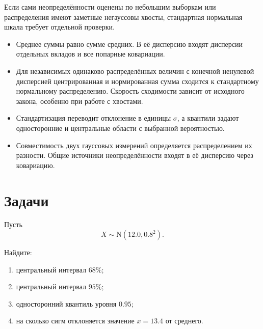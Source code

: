 \documentclass[
  russian,
  11pt,
  a4paper,
  open=any]{scrbook}
\providecommand{\tightlist}{%
  \setlength{\itemsep}{0pt}\setlength{\parskip}{0pt}}
\begin{document}
Если сами неопределённости оценены по небольшим выборкам или
распределения имеют заметные негауссовы хвосты, стандартная нормальная
шкала требует отдельной проверки.

\begin{bookchaptersummary}

\begin{itemize}
\tightlist
\item
  Среднее суммы равно сумме средних. В её дисперсию входят дисперсии
  отдельных вкладов и все попарные ковариации.
\item
  Для независимых одинаково распределённых величин с конечной ненулевой
  дисперсией центрированная и нормированная сумма сходится к
  стандартному нормальному распределению. Скорость сходимости зависит от
  исходного закона, особенно при работе с хвостами.
\item
  Стандартизация переводит отклонение в единицы \(\sigma\), а квантили
  задают односторонние и центральные области с выбранной вероятностью.
\item
  Совместимость двух гауссовых измерений определяется распределением их
  разности. Общие источники неопределённости входят в её дисперсию через
  ковариацию.
\end{itemize}

\end{bookchaptersummary}

\section{Задачи}\label{ux437ux430ux434ux430ux447ux438-3}

\begin{semanticpdfbox}[colback=BookCoralSoft,borderline west={1.2mm}{0pt}{BookCoral}]

\par\nopagebreak[4]\vspace{1.2mm}

Пусть \[
X\sim\mathrm{N}(12.0,0.8^2).
\]

Найдите:

\begin{enumerate}
\def\labelenumi{\arabic{enumi}.}
\tightlist
\item
  центральный интервал \(68\%\);
\item
  центральный интервал \(95\%\);
\item
  односторонний квантиль уровня \(0.95\);
\item
  на сколько сигм отклоняется значение \(x=13.4\) от среднего.
\end{enumerate}

\end{semanticpdfbox}
\end{document}
